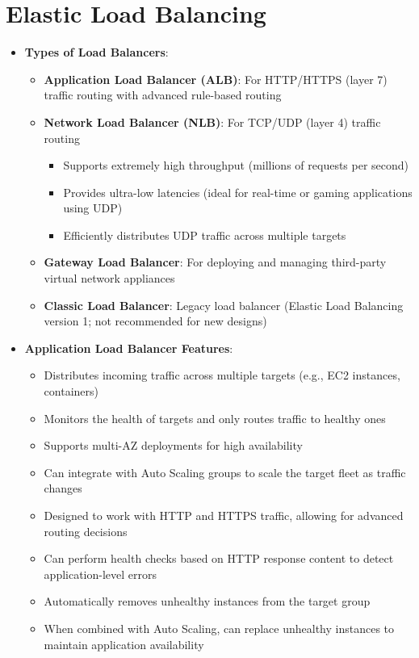 \documentclass[11pt,a4paper]{report}
\begin{document}
\section{Elastic Load Balancing}

\begin{itemize}
  \item \textbf{Types of Load Balancers}:
\begin{itemize}
  \item \textbf{Application Load Balancer (ALB)}: For HTTP/HTTPS (layer 7) traffic routing with advanced rule-based routing
  \item \textbf{Network Load Balancer (NLB)}: For TCP/UDP (layer 4) traffic routing
\begin{itemize}
  \item Supports extremely high throughput (millions of requests per second)
  \item Provides ultra-low latencies (ideal for real-time or gaming applications using UDP)
  \item Efficiently distributes UDP traffic across multiple targets
\end{itemize}
  \item \textbf{Gateway Load Balancer}: For deploying and managing third-party virtual network appliances
  \item \textbf{Classic Load Balancer}: Legacy load balancer (Elastic Load Balancing version 1; not recommended for new designs)
\end{itemize}
  \item \textbf{Application Load Balancer Features}:
\begin{itemize}
  \item Distributes incoming traffic across multiple targets (e.g., EC2 instances, containers)
  \item Monitors the health of targets and only routes traffic to healthy ones
  \item Supports multi-AZ deployments for high availability
  \item Can integrate with Auto Scaling groups to scale the target fleet as traffic changes
  \item Designed to work with HTTP and HTTPS traffic, allowing for advanced routing decisions
  \item Can perform health checks based on HTTP response content to detect application-level errors
  \item Automatically removes unhealthy instances from the target group
  \item When combined with Auto Scaling, can replace unhealthy instances to maintain application availability

\end{itemize}
\end{itemize}
\end{document}
